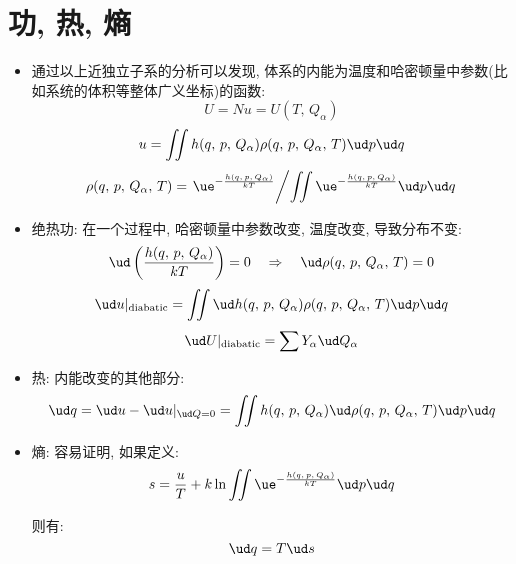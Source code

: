 \section{功, 热, 熵}

\begin{itemize}
	\item 通过以上近独立子系的分析可以发现, 体系的内能为温度和哈密顿量中参数(比如系统的体积等整体广义坐标)的函数:
	\[U=Nu=U(T,\,Q_\alpha)\]
	\[u=\iint h(q,\,p,\,Q_\alpha)\rho (q,\,p,\,Q_\alpha,\,T)\ud p\ud q\]
	\[\rho (q,\,p,\,Q_\alpha,\,T)=\left.\ue^{-\frac{h(q,\,p,\,Q_\alpha)}{kT}}\middle/\iint \ue^{-\frac{h(q,\,p,\,Q_\alpha)}{kT}}\ud p\ud q\right.\]
	\item 绝热功: 在一个过程中, 哈密顿量中参数改变, 温度改变, 导致分布不变:
	\[\ud\left(\frac{h(q,\,p,\,Q_\alpha)}{kT}\right)=0\quad \Rightarrow \quad\ud \rho (q,\,p,\,Q_\alpha,\,T)=0\]
	\[\ud u|_{\rm diabatic}=\iint \ud h(q,\,p,\,Q_\alpha)\rho (q,\,p,\,Q_\alpha,\,T)\ud p\ud q\]
	\[\ud U|_{\rm diabatic}=\sum Y_\alpha \ud Q_\alpha\]

	\item 热: 内能改变的其他部分:
	\[\ud q=\ud u-\ud u|_{\ud Q=0}=\iint h(q,\,p,\,Q_\alpha)\ud \rho (q,\,p,\,Q_\alpha,\,T)\ud p\ud q\]

	\item 熵: 容易证明, 如果定义:
	\[s=\frac{u}{T}+k\ln \iint\ue^{-\frac{h(q,\,p,\,Q_\alpha)}{kT}}\ud p\ud q\]

	则有:
	\[\ud q=T\ud s\]
\end{itemize}






